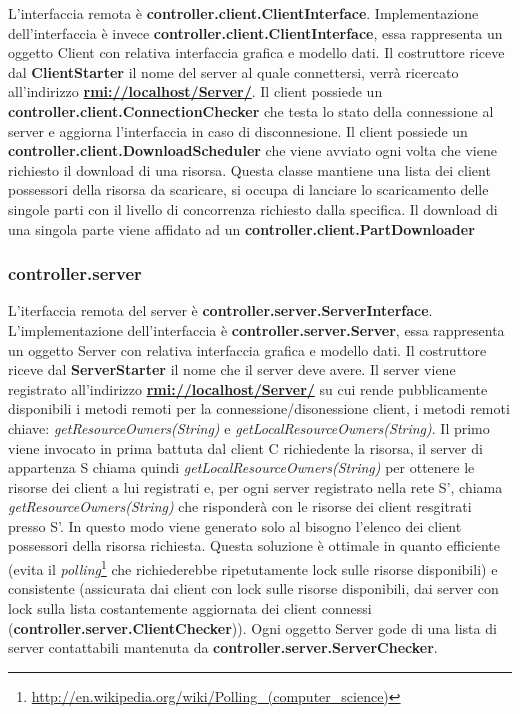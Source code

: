 \documentclass[
10pt, %
a4paper, %
oneside, %
BCOR5mm, %
]{scrartcl}
\begin{document}
 			L'interfaccia remota è \textbf{controller.client.ClientInterface}.
 			Implementazione dell'interfaccia è invece \textbf{controller.client.ClientInterface}, essa rappresenta un oggetto Client con relativa interfaccia grafica e modello dati. Il costruttore riceve dal \textbf{ClientStarter} il nome del server al quale connettersi, verrà ricercato all'indirizzo \textbf{\href{rmi://localhost/Server/}{rmi://localhost/Server/}}. Il client possiede un \textbf{controller.client.ConnectionChecker} che testa lo stato della connessione al server e aggiorna l'interfaccia in caso di disconnesione. Il client possiede un \textbf{controller.client.DownloadScheduler} che viene avviato ogni volta che viene richiesto il download di una risorsa. Questa classe mantiene una lista dei client possessori della risorsa da scaricare, si occupa di lanciare lo scaricamento delle singole parti con il livello di concorrenza richiesto dalla specifica. Il download di una singola parte viene affidato ad un \textbf{controller.client.PartDownloader}  

 		\subsubsection{controller.server}

 			L'iterfaccia remota del server è \textbf{controller.server.ServerInterface}. L'implementazione dell'interfaccia è \textbf{controller.server.Server}, essa rappresenta un oggetto Server con relativa interfaccia grafica e modello dati. Il costruttore riceve dal \textbf{ServerStarter} il nome che il server deve avere. Il server viene registrato all'indirizzo \textbf{\href{rmi://localhost/Server/nome_server}{rmi://localhost/Server/}} su cui rende pubblicamente disponibili i metodi remoti per la connessione/disonessione client, i metodi remoti chiave: \emph{getResourceOwners(String)} e \emph{getLocalResourceOwners(String)}.
 			Il primo viene invocato in prima battuta dal client C richiedente la risorsa, il server di appartenza S chiama quindi \emph{getLocalResourceOwners(String)} per ottenere le risorse dei client a lui registrati e, per ogni server registrato nella rete S', chiama \emph{getResourceOwners(String)} che risponderà con le risorse dei client resgitrati presso S'. In questo modo viene generato solo al bisogno l'elenco dei client possessori della risorsa richiesta. Questa soluzione è ottimale in quanto efficiente (evita il \emph{polling}\footnote{\href{http://en.wikipedia.org/wiki/Polling_(computer_science)}{http://en.wikipedia.org/wiki/Polling\_(computer\_science)}} che richiederebbe ripetutamente  lock sulle risorse disponibili) e consistente (assicurata dai client con lock sulle risorse disponibili, dai server con lock sulla lista costantemente aggiornata dei client connessi (\textbf{controller.server.ClientChecker})). Ogni oggetto Server gode di una lista di server contattabili mantenuta da \textbf{controller.server.ServerChecker}.
\end{document}
